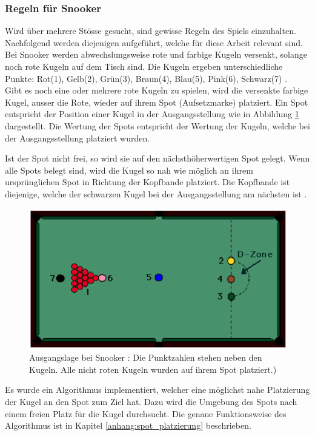 \subsubsection{Regeln für Snooker}\label{kap:tiefensuche:regeln_fuer_snooker}
Wird über mehrere Stösse gesucht, sind gewisse Regeln des Spiels einzuhalten.
Nachfolgend werden diejenigen aufgeführt, welche für diese Arbeit relevant sind.
Bei Snooker werden abwechslungsweise rote und farbige Kugeln versenkt, solange noch rote Kugeln auf dem Tisch sind.
Die Kugeln ergeben unterschiedliche Punkte: Rot(1), Gelb(2), Grün(3), Braun(4), Blau(5), Pink(6), Schwarz(7) \cite{stoppball:spielregel:snooker}.\\
Gibt es noch eine oder mehrere rote Kugeln zu spielen, wird die versenkte farbige Kugel, ausser die Rote, wieder
auf ihrem Spot (Aufsetzmarke) platziert.
Ein Spot entspricht der Position einer Kugel in der Ausgangsstellung wie in Abbildung \ref{fig:snooker_ausgangslage} dargestellt.
Die Wertung der Spots entspricht der Wertung der Kugeln, welche bei der Ausgangsstellung platziert wurden.

Ist der Spot nicht frei, so wird sie auf den nächsthöherwertigen Spot gelegt.
Wenn alle Spots belegt sind, wird die Kugel so nah wie möglich an ihrem ursprünglichen Spot in Richtung der Kopfbande platziert.
Die Kopfbande ist diejenige, welche der schwarzen Kugel bei der Ausgangsstellung am nächsten ist \cite{stoppball:spielregel:snooker}.

\begin{figure}[h!]
    \begin{center}
        \includegraphics[width=0.4\linewidth]{../common/03_billiard_ai/resources/39_snooker_ausgangslage.png}
    \end{center}
    \caption{Ausgangslage bei Snooker \cite{stoppball:spielregel:snooker}:
    Die Punktzahlen stehen neben den Kugeln.
    Alle nicht roten Kugeln wurden auf ihrem Spot platziert.)
    }
    \label{fig:snooker_ausgangslage}
\end{figure}

Es wurde ein Algorithmus implementiert, welcher eine möglichst nahe Platzierung der Kugel an den Spot zum Ziel hat.
Dazu wird die Umgebung des Spots nach einem freien Platz für die Kugel durchsucht.
Die genaue Funktionsweise des Algorithmus ist in Kapitel \ref{anhang:spot_platzierung} beschrieben.
